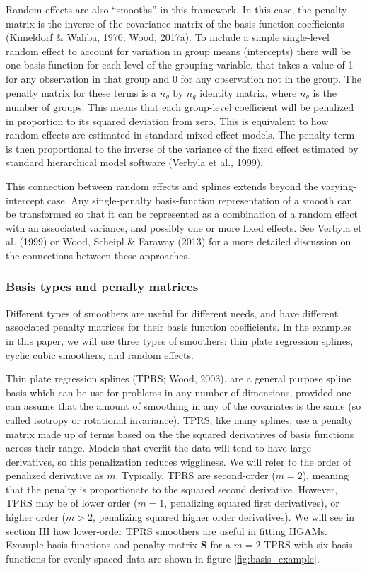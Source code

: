 \documentclass[12pt]{article}
\begin{document}
Random effects are also ``smooths'' in this framework. In this case, the
penalty matrix is the inverse of the covariance matrix of the basis
function coefficients (Kimeldorf \& Wahba, 1970; Wood, 2017a). To
include a simple single-level random effect to account for variation in
group means (intercepts) there will be one basis function for each level
of the grouping variable, that takes a value of 1 for any observation in
that group and 0 for any observation not in the group. The penalty
matrix for these terms is a \(n_g\) by \(n_g\) identity matrix, where
\(n_g\) is the number of groups. This means that each group-level
coefficient will be penalized in proportion to its squared deviation
from zero. This is equivalent to how random effects are estimated in
standard mixed effect models. The penalty term is then proportional to
the inverse of the variance of the fixed effect estimated by standard
hierarchical model software (Verbyla et al., 1999).

This connection between random effects and splines extends beyond the
varying-intercept case. Any single-penalty basis-function representation
of a smooth can be transformed so that it can be represented as a
combination of a random effect with an associated variance, and possibly
one or more fixed effects. See Verbyla et al. (1999) or Wood, Scheipl \&
Faraway (2013) for a more detailed discussion on the connections between
these approaches.

\subsubsection{Basis types and penalty
matrices}\label{basis-types-and-penalty-matrices}

Different types of smoothers are useful for different needs, and have
different associated penalty matrices for their basis function
coefficients. In the examples in this paper, we will use three types of
smoothers: thin plate regression splines, cyclic cubic smoothers, and
random effects.

Thin plate regression splines (TPRS; Wood, 2003), are a general purpose
spline basis which can be use for problems in any number of dimensions,
provided one can assume that the amount of smoothing in any of the
covariates is the same (so called isotropy or rotational invariance).
TPRS, like many splines, use a penalty matrix made up of terms based on
the the squared derivatives of basis functions across their range.
Models that overfit the data will tend to have large derivatives, so
this penalization reduces wiggliness. We will refer to the order of
penalized derivative as \(m\). Typically, TPRS are second-order
(\(m=2\)), meaning that the penalty is proportionate to the squared
second derivative. However, TPRS may be of lower order (\(m=1\),
penalizing squared first derivatives), or higher order (\(m > 2\),
penalizing squared higher order derivatives). We will see in section III
how lower-order TPRS smoothers are useful in fitting HGAMs. Example
basis functions and penalty matrix \(\mathbf{S}\) for a \(m=2\) TPRS
with six basis functions for evenly spaced data are shown in figure
\ref{fig:basis_example}.
\end{document}
